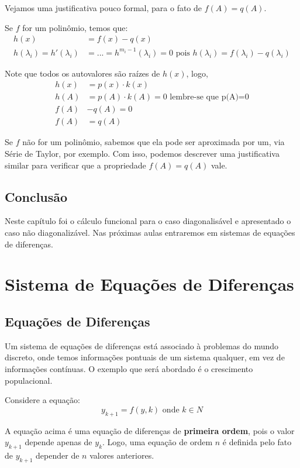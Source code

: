 \documentclass[12pt]{article}
\begin{document}
	Vejamos uma justificativa pouco formal, para o fato de $f(A)=q(A)$.
	
	Se $f$ for um polinômio, temos que:
	\begin{align*}
		h(x)&=f(x)-q(x)\\
		h(\lambda_i)=h'(\lambda_i)&=...=h^{m_i-1}(\lambda_i)=0 \mbox{ pois } h(\lambda_i)=f(\lambda_i)-q(\lambda_i)
	\end{align*}
	
	Note que todos os autovalores são raízes de $h(x)$, logo,
	\begin{align*}
		h(x)&=p(x)\cdot k(x)\\
		h(A)&=p(A)\cdot k(A)=0 \mbox{ lembre-se que p(A)=0}\\
		f(A)&-q(A)=0\\
		f(A)&=q(A)
	\end{align*}
	
	Se $f$ não for um polinômio, sabemos que ela pode ser aproximada por um, via Série de Taylor, por exemplo. Com isso, podemos descrever uma justificativa similar para verificar que a propriedade $f(A)=q(A)$ vale.
	
	\subsection{Conclusão}
	Neste capítulo foi o cálculo funcional para o caso diagonalisável e apresentado o caso não diagonalizável. Nas próximas aulas entraremos em sistemas de equações de diferenças.
	
	
	\section{Sistema de Equações de Diferenças}
	
	\subsection{Equações de Diferenças}
	
	Um sistema de equações de diferenças está associado à problemas do mundo discreto, onde temos informações pontuais de um sistema qualquer, em vez de informações contínuas. O exemplo que será abordado é o crescimento populacional.
	
	Considere a equação:
	\begin{equation*}
		y_{k+1}=f(y,k)\mbox{ onde }k\in N
	\end{equation*}
	
	A equação acima é uma equação de diferenças de \textbf{primeira ordem}, pois o valor $y_{k+1}$ depende apenas de $y_k$. Logo, uma equação de ordem $n$ é definida pelo fato de $y_{k+1}$ depender de $n$ valores anteriores.
	
\end{document}
